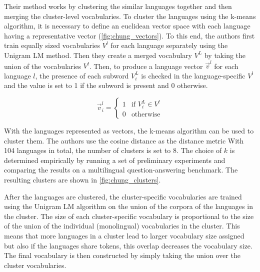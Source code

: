 Their method works by clustering the similar languages together and then merging the cluster-level vocabularies. To cluster the languages using the k-means algorithm, it is necessary to define an euclidean vector space with each language having a representative vector (\autoref{fig:chung_vectors}). To this end, the authors first train equally sized vocabularies $V^l$ for each language separately using the Unigram LM method. Then they create a merged vocabulary $V^L$ by taking the union of the vocabularies $V^l$. Then, to produce a language vector $\vec{v}^l$ for each language $l$, the presence of each subword $V^L_i$ is checked in the language-specific $V^l$ and the value is set to 1 if the subword is present and 0 otherwise. 

\begin{equation}
    \vec{v}^l_i = \begin{cases}
        1 & \text{if } V^L_i \in V^l \\
        0 & \text{otherwise}
    \end{cases}
\end{equation}

With the languages represented as vectors, the k-means algorithm can be used to cluster them. The authors use the cosine distance as the distance metric 
With 104 languages in total, the number of clusters is set to 8. The choice of $k$ is determined empirically by running a set of preliminary experiments and comparing the results on a multilingual question-answering benchmark. The resulting clusters are shown in \autoref{fig:chung_clusters}.

After the languages are clustered, the cluster-specific vocabularies are trained using the Unigram LM algorithm on the union of the corpora of the languages in the cluster. The size of each cluster-specific vocabulary is proportional to the size of the union of the individual (monolingual) vocabularies in the cluster. This means that more languages in a cluster lead to larger vocabulary size assigned but also if the languages share tokens, this overlap decreases the vocabulary size. The final vocabulary is then constructed by simply taking the union over the cluster vocabularies.


